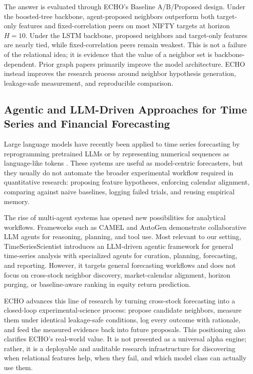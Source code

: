 \documentclass[12pt,a4paper,titlepage]{article}
\begin{document}
The answer is evaluated through ECHO's Baseline A/B/Proposed design. Under the boosted-tree backbone, agent-proposed neighbors outperform both target-only features and fixed-correlation peers on most NIFTY targets at horizon $H=10$. Under the LSTM backbone, proposed neighbors and target-only features are nearly tied, while fixed-correlation peers remain weakest. This is not a failure of the relational idea; it is evidence that the value of a neighbor set is backbone-dependent. Prior graph papers primarily improve the model architecture. ECHO instead improves the research process around neighbor hypothesis generation, leakage-safe measurement, and reproducible comparison.

\subsection{Agentic and LLM-Driven Approaches for Time Series and Financial Forecasting}

Large language models have recently been applied to time series forecasting by reprogramming pretrained LLMs or by representing numerical sequences as language-like tokens \citep{jin2023time,zhou2023}. These systems are useful as model-centric forecasters, but they usually do not automate the broader experimental workflow required in quantitative research: proposing feature hypotheses, enforcing calendar alignment, comparing against naive baselines, logging failed trials, and reusing empirical memory.

The rise of multi-agent systems has opened new possibilities for analytical workflows. Frameworks such as CAMEL \citep{li2023camel} and AutoGen \citep{wu2023autogen} demonstrate collaborative LLM agents for reasoning, planning, and tool use. Most relevant to our setting, TimeSeriesScientist \citep{zhao2025timeseriesscientist} introduces an LLM-driven agentic framework for general time-series analysis with specialized agents for curation, planning, forecasting, and reporting. However, it targets general forecasting workflows and does not focus on cross-stock neighbor discovery, market-calendar alignment, horizon purging, or baseline-aware ranking in equity return prediction.

ECHO advances this line of research by turning cross-stock forecasting into a closed-loop experimental-science process: propose candidate neighbors, measure them under identical leakage-safe conditions, log every outcome with rationale, and feed the measured evidence back into future proposals. This positioning also clarifies ECHO's real-world value. It is not presented as a universal alpha engine; rather, it is a deployable and auditable research infrastructure for discovering when relational features help, when they fail, and which model class can actually use them.
\end{document}
